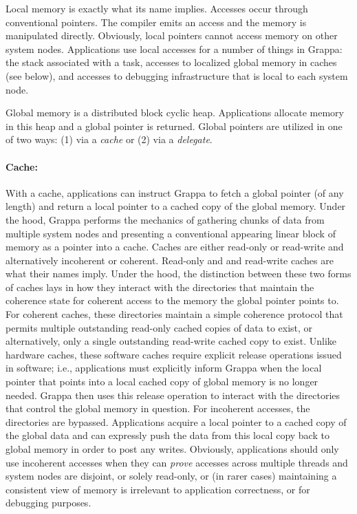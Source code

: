 Local memory is exactly what its name implies.  Accesses occur through conventional pointers.  The compiler emits an access and the memory is manipulated directly.  Obviously, local pointers cannot access memory on other system nodes.  Applications use local accesses for a number of things in Grappa: the stack associated with a task, accesses to localized global memory in caches (see below), and accesses to debugging infrastructure that is local to each system node.

Global memory is a distributed block cyclic heap.  Applications allocate memory in this heap and a global pointer is returned.  Global pointers are utilized in one of two ways: (1) via a \emph{cache} or (2) via a \emph{delegate}.

\paragraph{Cache:} With a cache, applications can instruct Grappa to fetch a global pointer (of any length) and return a local pointer to a cached copy of the global memory.  Under the hood, Grappa performs the mechanics of gathering chunks of data from multiple system nodes and presenting a conventional appearing linear block of memory as a pointer into a cache.  Caches are either read-only or read-write and alternatively incoherent or coherent.  Read-only and and read-write caches are what their names imply.  Under the hood, the distinction between these two forms of caches lays in how they interact with the directories that maintain the coherence state for coherent access to the memory the global pointer points to.  For coherent caches, these directories maintain a simple coherence protocol that permits multiple outstanding read-only cached copies of data to exist, or alternatively, only a single outstanding read-write cached copy to exist.  Unlike hardware caches, these software caches require explicit release operations issued in software; i.e., applications must explicitly inform Grappa when the local pointer that points into a local cached copy of global memory is no longer needed.  Grappa then uses this release operation to interact with the directories that control the global memory in question.  For incoherent accesses, the directories are bypassed.  Applications acquire a local pointer to a cached copy of the global data and can expressly push the data from this local copy back to global memory in order to post any writes.  Obviously, applications should only use incoherent accesses when they can \emph{prove} accesses across multiple threads and system nodes are disjoint, or solely read-only, or (in rarer cases) maintaining a consistent view of memory is irrelevant to application correctness, or for debugging purposes.

